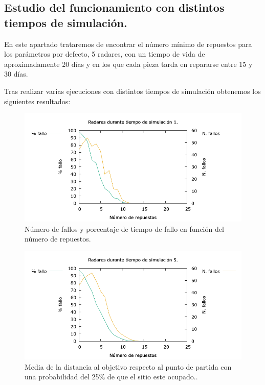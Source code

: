 \documentclass[12pt, spanish]{article}
\begin{document}
\subsection{Estudio del funcionamiento con distintos tiempos de simulación.}

En este apartado trataremos de encontrar el número mínimo de repuestos para los parámetros por defecto, 5 radares, con un tiempo de vida de aproximadamente 20 días y en los que cada pieza tarda en repararse entre 15 y 30 días.

Tras realizar varias ejecuciones con distintos tiempos de simulación obtenemos los siguientes resultados:


\begin{figure}[H]
	\centering
	\includegraphics[scale = 0.6]{radares_1.png}
	\caption{Número de fallos y porcentaje de tiempo de fallo en función del número de repuestos.}
	\label{fig:ej4}
\end{figure}

\begin{figure}[H]
	\centering
	\includegraphics[scale = 0.6]{radares_5.png}
	\caption{Media de la distancia al objetivo respecto al punto de partida con una probabilidad del 25\% de que el sitio este ocupado..}
	\label{fig:ej4}
\end{figure}
\end{document}

